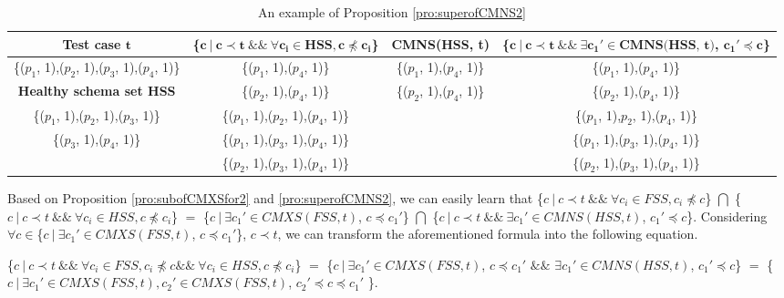 {\begin{table}[ht]
  \centering
  \setlength{\tabcolsep}{1pt}
  \caption{An example of Proposition \ref{pro:superofCMNS2}}
  {\footnotesize
    \begin{tabular}{|c|c|c|c|}
    \hline
  \textbf{  Test case $\textbf{t}$} & \textbf{ \{$\textbf{c}\ |\ \textbf{c} \prec \textbf{t}\ \&\&\ \forall \textbf{c}_{\textbf{i}} \in \textbf{HSS}, \textbf{c} \npreceq \textbf{c}_{\textbf{i}} $\} }& \textbf{  CMNS(HSS, t)} & \textbf{\{$ \textbf{c}\ |\ \textbf{c} \prec \textbf{t} \ \&\& \ \exists \textbf{c}_{\textbf{1}}' \in \textbf{CMNS(HSS, t)}$, $\textbf{c}_{\textbf{1}}' \preceq \textbf{c}$\}}\\\hline
    \{($p_{1}$, 1),($p_{2}$, 1),($p_{3}$, 1),($p_{4}$, 1)\}  & \{($p_{1}$, 1),($p_{4}$, 1)\} & \{($p_{1}$, 1),($p_{4}$, 1)\} & \{($p_{1}$, 1),($p_{4}$, 1)\}\\ \cline{1-1}
      \textbf{Healthy schema set HSS}  & \{($p_{2}$, 1),($p_{4}$, 1)\} & \{($p_{2}$, 1),($p_{4}$, 1)\} & \{($p_{2}$, 1),($p_{4}$, 1)\} \\\cline{1-1}
     \{($p_{1}$, 1),($p_{2}$, 1),($p_{3}$, 1)\}         &\{($p_{1}$, 1),($p_{2}$, 1),($p_{4}$, 1)\}  &  &  \{($p_{1}$, 1),$p_{2}$, 1),($p_{4}$, 1)\}   \\
     \{($p_{3}$, 1),($p_{4}$, 1)\}         &\{($p_{1}$, 1),($p_{3}$, 1),($p_{4}$, 1)\}    &  &  \{($p_{1}$, 1),($p_{3}$, 1),($p_{4}$, 1)\}  \\
                         &\{($p_{2}$, 1),($p_{3}$, 1),($p_{4}$, 1)\}   &  & \{($p_{2}$, 1),($p_{3}$, 1),($p_{4}$, 1)\}   \\ \hline
    \end{tabular}}%
  \label{examleOfCMNSPro2}%
\end{table}%


Based on Proposition \ref{pro:subofCMXSfor2} and \ref{pro:superofCMNS2}, we can easily learn that \{$c\ |\ c \prec t\ \&\&\ \forall c_{i} \in FSS, c_{i} \npreceq c $\} $\bigcap$ \{$c\ |\ c \prec t\ \&\&\ \forall c_{i} \in HSS, c \npreceq c_{i} $\}  $=$  \{$ c\ |\ \exists c_{1}' \in CMXS(FSS, t)$, $c \preceq c_{1}'$\} $\bigcap$  \{$ c\ |\ c \prec t \ \&\& \ \exists c_{1}' \in CMNS(HSS, t)$, $c_{1}' \preceq c$\}. Considering $\forall c \in $\{$ c\ |\ \exists c_{1}' \in CMXS(FSS, t)$, $c \preceq c_{1}'$\}, $c \prec t$, we can transform the aforementioned formula into the following equation.

\{$c\ |\ c \prec t\ \&\&\ \forall c_{i} \in FSS, c _{i} \npreceq c \&\&\ \forall c_{i} \in HSS, c \npreceq c_{i}  $\} $=$  \{$ c\ |\ \exists c_{1}' \in CMXS(FSS, t)$, $c \preceq c_{1}'$ $\&\&$ $\exists c_{1}' \in CMNS(HSS, t)$, $c_{1}' \preceq c$\} $=$  \{$ c\ |\ \exists c_{1}' \in CMXS(FSS, t), c_{2}' \in CMXS(FSS, t)$, $c_{2}' \preceq c \preceq c_{1}'$ \}.

}

